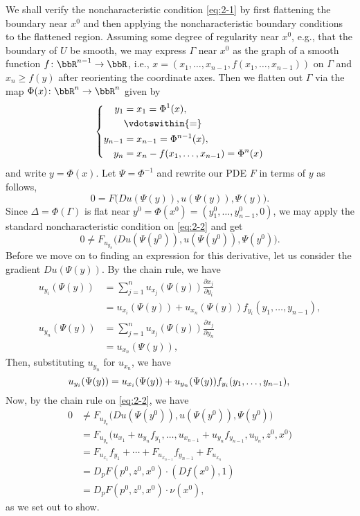 \begin{solution}
  We shall verify the noncharacteristic condition \eqref{eq:2-1} by first
  flattening the boundary near \(x^0\) and then applying the
  noncharacteristic boundary conditions to the flattened region. Assuming
  some degree of regularity near \(x^0\), e.g., that the boundary of \(U\)
  be smooth, we may express \(\Gamma\) near \(x^0\) as the graph of a
  smooth function \(f\colon\bbR^{n-1}\to\bbR\), i.e.,
  \(x=(x_1,\dotsc,x_{n-1},f(x_1,\dotsc,x_{n-1}))\) on \(\Gamma\) and
  \(x_n\geq f(y)\) after reorienting the coordinate axes. Then we flatten
  out \(\Gamma\) via the map \(\Phi(x)\colon\bbR^n\to\bbR^n\) given by
  \[
    \left\{
      \begin{aligned}
        y_1&=x_1=\Phi^1(x),\\
        &\vdotswithin{=}\\
        y_{n-1}&=x_{n-1}=\Phi^{n-1}(x),\\
        y_n&=x_n-f(x_1,\dotsc,x_{n-1})=\Phi^n(x)
      \end{aligned}
    \right.
  \]
  and write \(y=\Phi(x)\). Let \(\Psi=\Phi^{-1}\) and rewrite our PDE \(F\)
  in terms of \(y\) as follows,
  \begin{equation}
    \label{eq:2-2}
    0=F\bigl(Du(\Psi(y)),u(\Psi(y)),\Psi(y)\bigr).
  \end{equation}
  Since \(\Delta=\Phi(\Gamma)\) is flat near
  \(y^0=\Phi(x^0)=(y_1^0,\dotsc,y_{n-1}^0,0)\), we may apply the standard
  noncharacteristic condition on \eqref{eq:2-2} and get
  \[
    0\neq F_{u_{y_n}}\bigl(Du(\Psi(y^0)),u(\Psi(y^0)),\Psi(y^0)\bigr).
  \]
  Before we move on to finding an expression for this derivative, let us
  consider the gradient \(Du(\Psi(y))\). By the chain rule, we have
  \begin{align*}
    u_{y_i}(\Psi(y))
    &=\sum_{j=1}^n u_{x_j}(\Psi(y))\frac{\partial x_j}{\partial y_i}\\
    &=u_{x_i}(\Psi(y))+u_{x_n}(\Psi(y))f_{y_i}(y_1,\dotsc,y_{n-1}),\\
    u_{y_n}(\Psi(y))
    &=\sum_{j=1}^n u_{x_j}(\Psi(y))\frac{\partial x_j}{\partial y_n}\\
    &=u_{x_n}(\Psi(y)),
  \end{align*}
  Then, substituting \(u_{y_n}\) for \(u_{x_n}\), we have
  \[
    u_{y_i}(\Psi(y))=u_{x_i}(\Psi(y))+u_{y_n}(\Psi(y))f_{y_i}(y_1,\dotsc,y_{n-1}),\\
  \]
  Now, by the chain rule on \eqref{eq:2-2}, we have
  \begin{align*}
    0&\neq F_{u_{y_n}}\bigl(Du(\Psi(y^0)),u(\Psi(y^0)),\Psi(y^0)\bigr)\\
     &=F_{u_{y_n}}
       \bigl(
       u_{x_1}+u_{y_n}f_{y_1},\dotsc,
       u_{x_{n-1}}+u_{y_n}f_{y_{n-1}},u_{y_n},z^0,x^0
       \bigr)\\
     &=F_{u_{x_1}}f_{y_1}+\dotsb+F_{u_{x_{n-1}}}f_{y_{n-1}}+F_{u_{x_n}}\\
     &=D_pF(p^0,z^0,x^0)\cdot(Df(x^0),1)\\
     &=D_pF(p^0,z^0,x^0)\cdot\nu(x^0),
  \end{align*}
  as we set out to show.
\end{solution}
\newpage


